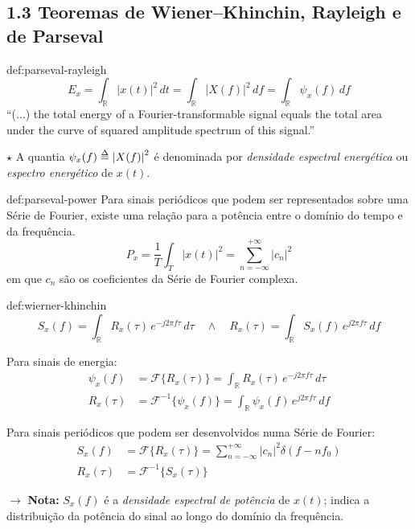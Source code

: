 \subsection{1.3 Teoremas de Wiener–Khinchin, Rayleigh e de Parseval}
\label{subsec:wierner-khinchin-parseval}

\begin{theo}{def:parseval-rayleigh}\label{def:parseval-rayleigh}
    $$
        E_x = \int_{\mathbb{R}} \left| x(t) \right|^2\, dt = \int_{\mathbb{R}} \left| X(f) \right|^2\, df = \int_{\mathbb{R}} \psi_x(f)\, df
    $$
    ``(...) the total energy of a Fourier-transformable signal equals the total area under the curve of squared amplitude spectrum of this signal.''\cite{Haykin2007}

    \noindent $\pmb{\star}$ A quantia $\psi_x(f) \delequal \left| X(f) \right|^2$ é denominada por \textit{densidade espectral energética} ou \textit{espectro energético} de $x(t)$.
\end{theo}

\begin{theo}{def:parseval-power}\label{def:parseval-power}
    Para sinais periódicos que podem ser representados sobre uma Série de Fourier, existe uma relação para a potência entre o domínio do tempo e da frequência.
    $$
        P_x = \frac{1}{T} \int_{T} \left| x(t) \right|^2 = \sum_{n=-\infty}^{+\infty} \left| c_n \right|^2
    $$
    em que $c_n$ são os coeficientes da Série de Fourier complexa.
\end{theo}

\begin{theo}{def:wierner-khinchin}\label{def:wierner-khinchin}
    $$
        S_x(f) = \int_{\mathbb{R}} R_x(\tau)\, e^{-j2\pi f \tau}\, d\tau 
        \quad \land \quad 
        R_x(\tau) = \int_{\mathbb{R}} S_x(f)\, e^{j2\pi f \tau}\, df
    $$

    \noindent Para sinais de energia:
    \begin{align*}
        \psi_x(f) &= \mathcal{F}\{R_x(\tau)\} = \int_{\mathbb{R}} R_x(\tau)\, e^{-j2\pi f \tau}\, d\tau \\
        R_x(\tau) &= \mathcal{F}^{-1}\{\psi_x(f)\} = \int_{\mathbb{R}} \psi_x(f)\, e^{j2\pi f \tau}\, df
    \end{align*}

    \noindent Para sinais periódicos que podem ser desenvolvidos numa Série de Fourier:
    \begin{align*}
        S_x(f) &= \mathcal{F}\{R_x(\tau)\} = \sum_{n=-\infty}^{+\infty} \left| c_n \right|^2 \delta(f-nf_0) \\
        R_x(\tau) &= \mathcal{F}^{-1}\{S_x(\tau)\}
    \end{align*}

    \vspace{0.25em}
    \noindent $\pmb{\rightarrow}$ \textbf{Nota:} $S_x(f)$ é a \textit{densidade espectral de potência} de $x(t)$; indica a distribuição da potência do sinal ao longo do domínio da frequência.
\end{theo}
